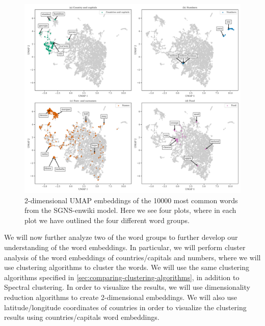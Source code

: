 \begin{figure}[H]
    \centering
    \includegraphics[width=\textwidth]{thesis/figures/word-cluster-all-groups-emphasis-plots.pdf}
    \caption{2-dimensional UMAP embeddings of the 10000 most common words from the SGNS-enwiki model. Here we see four plots, where in each plot we have outlined the four different word groups.}
    \label{fig:word-cluster-all-groups-emphasis-plots}
\end{figure}

We will now further analyze two of the word groups to further develop our understanding of the word embeddings. In particular, we will perform cluster analysis of the word embeddings of countries/capitals and numbers, where we will use clustering algorithms to cluster the words. We will use the same clustering algorithms specified in \cref{sec:comparing-clustering-algorithms}, in addition to Spectral clustering. In order to visualize the results, we will use dimensionality reduction algorithms to create 2-dimensional embeddings. We will also use latitude/longitude coordinates of countries in order to visualize the clustering results using countries/capitals word embeddings.

